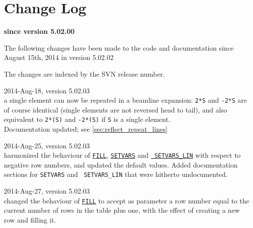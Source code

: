 \chapter{Change Log}
\label{chap:changelog}

\begin{center} 
\textbf{since version 5.02.00}
\end{center}

The following changes have been made to the code and documentation since
August 15th, 2014 in version 5.02.02

The changes are indexed by the SVN release number. 

\begin{madlist}

   2014-Aug-18, version 5.02.03 \\
  a single element can now be repeated in a beamline expansion:
  \texttt{2*S} and \texttt{-2*S} are of course identical (single
  elements are not reversed head to tail), and also equivalent to
  \texttt{2*(S)} and \texttt{-2*(S)} if \texttt{S} is a single
  element.\\
  Documentation updated; see \ref{sec:reflect_repeat_lines}


   2014-Aug-25, version 5.02.03 \\
  harmonized the behaviour of \hyperref[sec:fill]{\tt FILL},
  \hyperref[sec:setvars]{\tt SETVARS} and \hyperref[sec:setvars_lin]{\tt
    SETVARS\_LIN} with respect to negative row numbers, and updated the
  default values. Added documentation sections for {\tt SETVARS} and {\tt
    SETVARS\_LIN} that were hitherto undocumented.  


   2014-Aug-27, version 5.02.03 \\
  changed the behaviour of \hyperref[sec:fill]{\tt FILL} to accept as
  parameter a row number equal to the current number of rows in the
  table plus one, with the effect of creating a new row and filling it. 

\end{madlist}
  


\newpage

